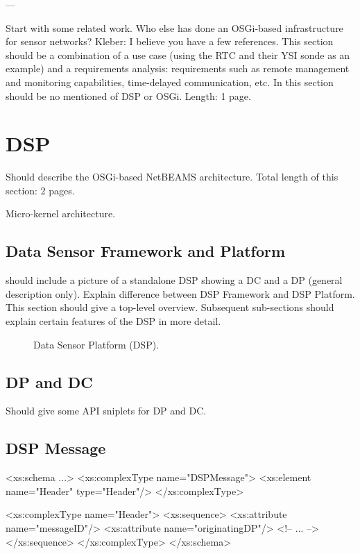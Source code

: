 \documentclass[conference]{IEEEtran}
\begin{document}
---

Start with some related work. Who else has done an OSGi-based
infrastructure for sensor networks? Kleber: I believe you have a few
references. This section should be a combination of a use case (using
the RTC and their YSI sonde as an example) and a requirements
analysis: requirements such as remote management and monitoring
capabilities, time-delayed communication, etc. In this section should
be no mentioned of DSP or OSGi. Length: 1 page.

\section{DSP}

Should describe the OSGi-based NetBEAMS architecture. Total length of
this section: 2 pages.

Micro-kernel architecture.

\subsection{Data Sensor Framework and Platform}

should include a picture of a standalone DSP showing a DC and a DP
(general description only). Explain difference between DSP Framework
and DSP Platform. This section should give a top-level overview.
Subsequent sub-sections should explain certain features of the DSP in
more detail.

\begin{figure}
\centering
{}
\caption{\label{FIG_DSP} Data Sensor Platform (DSP).}
\end{figure}

\subsection{DP and DC}

Should give some API sniplets for DP and DC.

\subsection{DSP Message}

\begin{code}
<xs:schema ...>
  <xs:complexType name="DSPMessage">
    <xs:element name="Header" type="Header"/>
  </xs:complexType>

  <xs:complexType name="Header">
    <xs:sequence>
      <xs:attribute name="messageID"/>
      <xs:attribute name="originatingDP"/>
      <!-- ... -->
    </xs:sequence>
  </xs:complexType>
</xs:schema>
\end{code}
\end{document}
